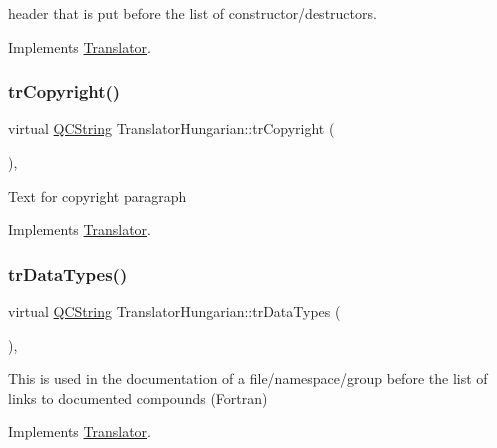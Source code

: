 header that is put before the list of constructor/destructors. 

Implements \mbox{\hyperlink{class_translator}{Translator}}.

\mbox{\label{class_translator_hungarian_a4acb42a0d5ec59447adb8039c493c459}} 
\subsubsection{\texorpdfstring{trCopyright()}{trCopyright()}}
{\footnotesize\ttfamily virtual \mbox{\hyperlink{class_q_c_string}{Q\+C\+String}} Translator\+Hungarian\+::tr\+Copyright (\begin{DoxyParamCaption}{ }\end{DoxyParamCaption})\hspace{0.3cm}{\ttfamily [inline]}, {\ttfamily [virtual]}}

Text for copyright paragraph 

Implements \mbox{\hyperlink{class_translator}{Translator}}.

\mbox{\label{class_translator_hungarian_a701c30dab40cbd483726fa39a69ca261}} 
\subsubsection{\texorpdfstring{trDataTypes()}{trDataTypes()}}
{\footnotesize\ttfamily virtual \mbox{\hyperlink{class_q_c_string}{Q\+C\+String}} Translator\+Hungarian\+::tr\+Data\+Types (\begin{DoxyParamCaption}{ }\end{DoxyParamCaption})\hspace{0.3cm}{\ttfamily [inline]}, {\ttfamily [virtual]}}

This is used in the documentation of a file/namespace/group before the list of links to documented compounds (Fortran) 

Implements \mbox{\hyperlink{class_translator}{Translator}}.

\mbox{\label{class_translator_hungarian_a64efe330103d27cbe66f3415da14f31e}} 
